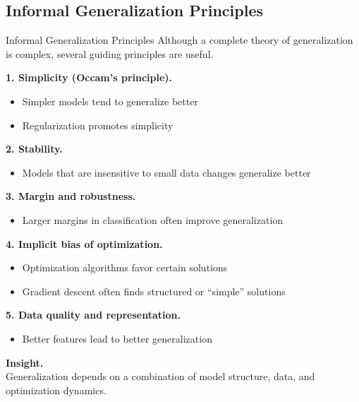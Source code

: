 \documentclass[aspectratio=169,11pt]{beamer}
\begin{document}
\subsection{Informal Generalization Principles}
\begin{frame}[t,allowframebreaks]{Informal Generalization Principles}
\small
Although a complete theory of generalization is complex, several guiding principles are useful.

\textbf{1. Simplicity (Occam's principle).}\\ \begin{itemize}
    \item Simpler models tend to generalize better
    \item Regularization promotes simplicity
\end{itemize}

\textbf{2. Stability.}\\ \begin{itemize}
    \item Models that are insensitive to small data changes generalize better
\end{itemize}

\textbf{3. Margin and robustness.}\\ \begin{itemize}
    \item Larger margins in classification often improve generalization
\end{itemize}

\textbf{4. Implicit bias of optimization.}\\ \begin{itemize}
    \item Optimization algorithms favor certain solutions
    \item Gradient descent often finds structured or “simple” solutions
\end{itemize}

\textbf{5. Data quality and representation.}\\ \begin{itemize}
    \item Better features lead to better generalization
\end{itemize}

\textbf{Insight.}\\ Generalization depends on a combination of model structure, data, and optimization dynamics.
\end{frame}
\end{document}
